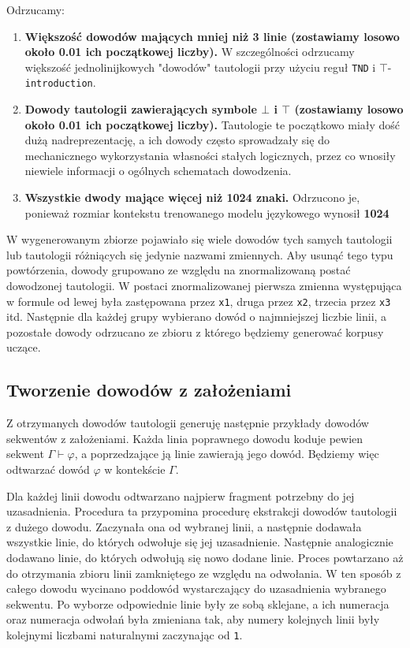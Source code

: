 \documentclass[shortabstract]{iithesis}
\theoremstyle{definition}
\theoremstyle{remark}
\theoremstyle{plain}
\begin{document}
Odrzucamy:
\begin{enumerate}[itemsep=0.4em, topsep=0.4em, parsep=0pt]
    \item \textbf{Większość dowodów mających mniej niż 3 linie (zostawiamy losowo około 0.01 ich początkowej liczby).} W szczególności odrzucamy większość jednolinijkowych "dowodów" 
    tautologii przy użyciu reguł \texttt{TND} i $\top$-\texttt{introduction}. 
    \item \textbf{Dowody tautologii zawierających symbole \(\bot\) i \(\top\) (zostawiamy losowo około 0.01 ich początkowej liczby).}
        Tautologie te początkowo miały dość dużą nadreprezentację, a ich dowody często
        sprowadzały się do mechanicznego wykorzystania własności stałych logicznych, przez
        co wnosiły niewiele informacji o ogólnych schematach dowodzenia.
    \item \textbf{Wszystkie dwody mające więcej niż 1024 znaki.} Odrzucono je, ponieważ rozmiar kontekstu trenowanego modelu językowego wynosił \textbf{1024}
\end{enumerate}

W wygenerowanym zbiorze pojawiało się wiele dowodów tych samych tautologii lub
tautologii różniących się jedynie nazwami zmiennych. Aby usunąć tego typu
powtórzenia, dowody grupowano ze względu na znormalizowaną postać dowodzonej
tautologii. W postaci znormalizowanej pierwsza zmienna występująca w formule od
lewej była zastępowana przez \texttt{x1}, druga przez \texttt{x2}, trzecia przez
\texttt{x3} itd. Następnie dla każdej grupy wybierano dowód o najmniejszej liczbie
linii, a pozostałe dowody odrzucano ze zbioru z którego będziemy generować korpusy uczące.

\subsection{Tworzenie dowodów z założeniami}
Z otrzymanych dowodów tautologii generuję następnie przykłady dowodów
sekwentów z założeniami. Każda linia poprawnego dowodu koduje pewien sekwent
\(\Gamma \vdash \varphi\), a poprzedzające ją linie zawierają jego dowód.
Będziemy więc odtwarzać dowód \(\varphi\) w kontekście \(\Gamma\).

Dla każdej linii dowodu odtwarzano najpierw fragment potrzebny do jej
uzasadnienia. Procedura ta przypomina procedurę ekstrakcji dowodów tautologii
z dużego dowodu. Zaczynała ona od wybranej linii, a następnie dodawała wszystkie
linie, do których odwołuje się jej uzasadnienie. Następnie analogicznie dodawano
linie, do których odwołują się nowo dodane linie. Proces powtarzano aż do
otrzymania zbioru linii zamkniętego ze względu na odwołania. W ten sposób
z całego dowodu wycinano poddowód wystarczający do uzasadnienia wybranego
sekwentu. Po wyborze odpowiednie linie były ze sobą sklejane, a ich numeracja
oraz numeracja odwołań była zmieniana tak, aby numery kolejnych linii były
kolejnymi liczbami naturalnymi zaczynając od \texttt{1}.
\end{document}
